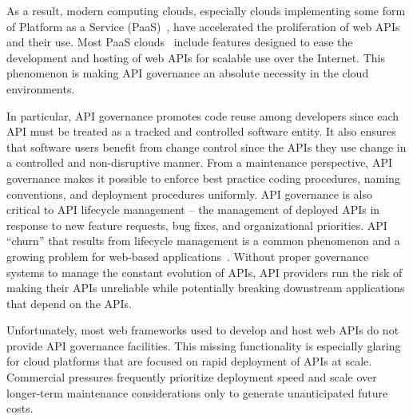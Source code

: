 As a result, modern computing clouds, especially clouds implementing some form
of Platform as a Service (PaaS)~\cite{4548165}, have accelerated the
proliferation of
web APIs and their use.  Most PaaS
clouds~\cite{appscale13,cloudfoundry,openshift} include
features designed to
ease the development and hosting of web APIs for scalable use over the Internet. 
This phenomenon is making API governance an absolute necessity in the cloud
environments.

In particular, API governance promotes code reuse among developers
since each API must be treated as a tracked and controlled software entity.
It also ensures that software users benefit from change control since the APIs
they use
change in a controlled and non-disruptive manner.  From a maintenance
perspective, API governance 
makes it possible to enforce best practice coding procedures, 
naming conventions, and deployment procedures uniformly.
API governance is also critical to API lifecycle
management --  the management of deployed APIs in response to new feature
requests, bug fixes, and organizational priorities. 
API ``churn'' that results from lifecycle management
is a common phenomenon and a growing
problem for web-based applications~\cite{portingeffort}.
Without proper governance systems to manage the constant evolution of APIs,
API providers run the risk of making their APIs unreliable while potentially
breaking downstream applications that depend on the APIs.


Unfortunately, most web frameworks used to develop and host web APIs do not 
provide API governance facilities. This missing functionality is
especially glaring
for cloud platforms that are focused on rapid
deployment of APIs at scale.   Commercial pressures frequently prioritize
deployment speed and scale over longer-term maintenance considerations only to
generate unanticipated future costs.

